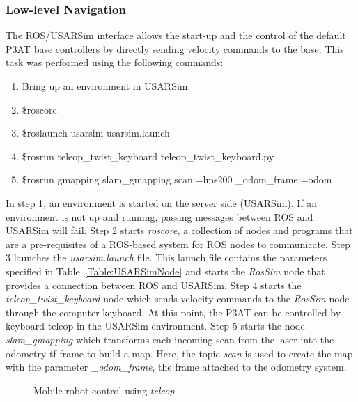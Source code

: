 \subsubsection*{Low-level Navigation}
The ROS/USARSim interface allows the start-up and the control of the default P3AT base controllers by directly sending velocity commands to the base. This task was performed using the following commands:
\begin{enumerate}
\item Bring up an environment in USARSim.
\item \$roscore
\item \$roslaunch usarsim usarsim.launch
\item \$rosrun teleop\_twist\_keyboard teleop\_twist\_keyboard.py
\item \$rosrun gmapping slam\_gmapping scan:=lms200 \_odom\_frame:=odom
\end{enumerate}

In step 1, an environment is started on the server side (USARSim). If an environment is not up and running, passing messages between ROS and USARSim will fail. Step 2 starts {\it roscore}, a collection of nodes and programs that are a pre-requisites of a ROS-based system for ROS nodes to communicate. Step 3 launches the {\it usarsim.launch} file. This launch file contains the parameters specified in Table~\ref{Table:USARSimNode} and starts the {\it RosSim} node that provides a connection between ROS and USARSim. Step 4 starts the {\it teleop\_twist\_keyboard} node which sends velocity commands to the {\it RosSim} node through the computer keyboard. At this point, the P3AT can be controlled by keyboard teleop in the USARSim environment. Step 5 starts the node {\it slam\_gmapping} which transforms each incoming scan from the laser into the odometry tf frame to build a map. Here, the topic {\it scan} is used to create the map with the parameter {\it \_odom\_frame}, the frame attached to the odometry system.


\begin{figure}[t!]
\centering
{}
\caption{\label{fig:teleop}Mobile robot control using {\it teleop}}
\end{figure}


